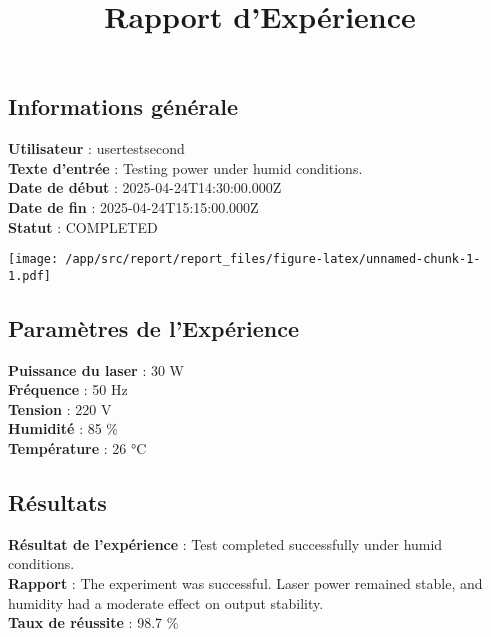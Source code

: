 \documentclass[
]{article}
\title{Rapport d'Expérience}
\author{}
\date{\vspace{-2.5em}}
\begin{document}
\maketitle

\hypertarget{informations-guxe9nuxe9rale}{%
\subsection{Informations générale}\label{informations-guxe9nuxe9rale}}

\textbf{Utilisateur} : usertestsecond\\
\textbf{Texte d'entrée} : Testing power under humid conditions.\\
\textbf{Date de début} : 2025-04-24T14:30:00.000Z\\
\textbf{Date de fin} : 2025-04-24T15:15:00.000Z\\
\textbf{Statut} : COMPLETED

\texttt{[image: /app/src/report/report\_files/figure-latex/unnamed-chunk-1-1.pdf]}

\hypertarget{paramuxe8tres-de-lexpuxe9rience}{%
\subsection{Paramètres de
l'Expérience}\label{paramuxe8tres-de-lexpuxe9rience}}

\textbf{Puissance du laser} : 30 W\\
\textbf{Fréquence} : 50 Hz\\
\textbf{Tension} : 220 V\\
\textbf{Humidité} : 85 \%\\
\textbf{Température} : 26 °C

\hypertarget{ruxe9sultats}{%
\subsection{Résultats}\label{ruxe9sultats}}

\textbf{Résultat de l'expérience} : Test completed successfully under
humid conditions.\\
\textbf{Rapport} : The experiment was successful. Laser power remained
stable, and humidity had a moderate effect on output stability.\\
\textbf{Taux de réussite} : 98.7 \%
\end{document}
